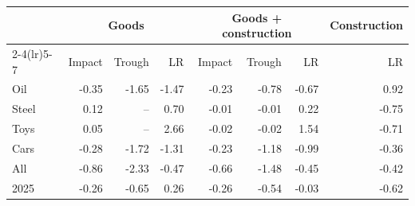 \begin{tabular}{lrrrrrrr}
\toprule
 & \multicolumn{3}{c}{Goods} & \multicolumn{3}{c}{Goods + construction} & Construction \\
\cmidrule(lr){2-4}\cmidrule(lr){5-7}
 & Impact & Trough & LR & Impact & Trough & LR & LR \\
\midrule
Oil & -0.35 & -1.65 & -1.47 & -0.23 & -0.78 & -0.67 & 0.92 \\
Steel & 0.12 & -- & 0.70 & -0.01 & -0.01 & 0.22 & -0.75 \\
Toys & 0.05 & -- & 2.66 & -0.02 & -0.02 & 1.54 & -0.71 \\
Cars & -0.28 & -1.72 & -1.31 & -0.23 & -1.18 & -0.99 & -0.36 \\
All & -0.86 & -2.33 & -0.47 & -0.66 & -1.48 & -0.45 & -0.42 \\
2025 & -0.26 & -0.65 & 0.26 & -0.26 & -0.54 & -0.03 & -0.62 \\
\bottomrule
\end{tabular}
